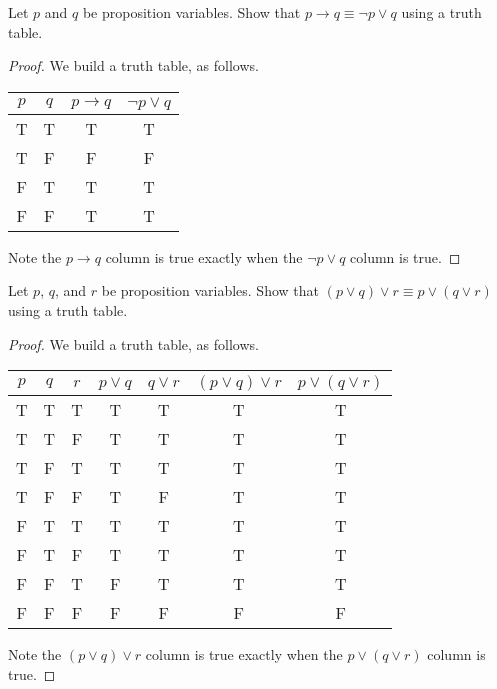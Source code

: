 \documentclass[../notes.tex]{subfiles}
\begin{document}
\begin{example} \label{exe:logical-conditional}
    Let $p$ and $q$ be proposition variables. Show that $p \rightarrow q  \equiv \neg p \lor q$ using a truth table.
\end{example}
\begin{proof}
    We build a truth table, as follows.
    \begin{center}
        \begin{tabular}{c|c|c|c}
            $p$ & $q$ & $p\to q$ & $\lnot p\lor q$ \\\hline
            T & T & T & T \\
            T & F & F & F \\
            F & T & T & T \\
            F & F & T & T
        \end{tabular}
    \end{center}
    Note the $p\to q$ column is true exactly when the $\lnot p\lor q$ column is true.
\end{proof}
\begin{example}
    Let $p$, $q$, and $r$ be proposition variables. Show that $(p \lor q) \lor r \equiv p \lor (q \lor r)$ using a truth table.
\end{example}
\begin{proof}
    We build a truth table, as follows.
    \begin{center}
        \begin{tabular}{c|c|c|c|c|c|c}
             $p$ & $q$ & $r$ & $p \lor q$ & $q \lor r$ & $(p \lor q) \lor r$ & $p \lor (q \lor r)$  \\
             \hline
             T & T & T & T &  T & T & T \\
             T & T & F & T &  T & T & T \\
             T & F & T & T &  T & T & T \\
             T & F & F & T &  F & T & T \\
             F & T & T & T &  T & T & T \\
             F & T & F & T &  T & T & T \\
             F & F & T & F &  T & T & T \\
             F & F & F & F &  F & F & F \\
        \end{tabular}
    \end{center}
    Note the $(p\lor q)\lor r$ column is true exactly when the $p\lor(q\lor r)$ column is true.
\end{proof}
\end{document}
